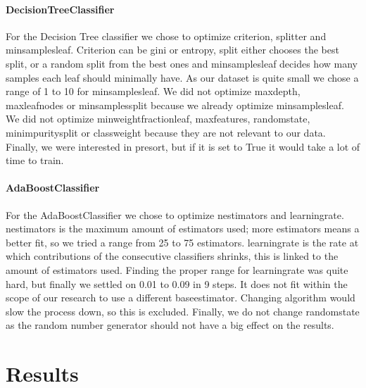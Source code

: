 \documentclass{article}
\begin{document}
		\paragraph{DecisionTreeClassifier}
			For the Decision Tree classifier we chose to optimize criterion, splitter and min\textunderscore samples\textunderscore leaf. Criterion can be gini or entropy, split either chooses the best split, or a random split from the best ones and min\textunderscore samples\textunderscore leaf decides how many samples each leaf should minimally have. As our dataset is quite small we chose a range of 1 to 10 for min\textunderscore samples\textunderscore leaf. We did not optimize max\textunderscore depth, max\textunderscore leaf\textunderscore nodes or min\textunderscore samples\textunderscore split because we already optimize min\textunderscore samples\textunderscore leaf. We did not  optimize min\textunderscore weight\textunderscore fraction\textunderscore leaf, max\textunderscore features, random\textunderscore state, min\textunderscore impurity\textunderscore split or class\textunderscore weight because they are not relevant to our data. Finally, we were interested in presort, but if it is set to True it would take a lot of time to train.

		\paragraph{AdaBoostClassifier}
			For the AdaBoostClassifier we chose to optimize n\textunderscore estimators and learning\textunderscore rate. n\textunderscore estimators is the maximum amount of estimators used; more estimators means a better fit, so we tried a range from 25 to 75 estimators. learning\textunderscore rate is the rate at which contributions of the consecutive classifiers shrinks, this is linked to the amount of estimators used. Finding the proper range for learning\textunderscore rate was quite hard, but finally we settled on 0.01 to 0.09 in 9 steps. It does not fit within the scope of our research to use a different base\textunderscore estimator. Changing algorithm would slow the process down, so this is excluded. Finally, we do not change random\textunderscore state as the random number generator should not have a big effect on the results. 

\newpage

\section{Results}
\end{document}
